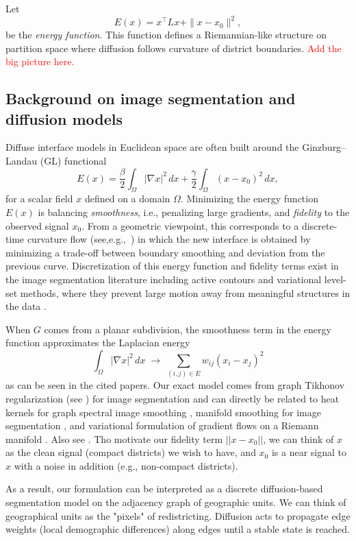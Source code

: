 \documentclass[11pt]{article}
\begin{document}
Let 
\[
E(x) = x^\top L x + \|x - x_0\|^2,
\]
be the \textit{energy function}. This function defines a Riemannian-like structure on partition space where diffusion follows curvature of district boundaries. \textcolor{red}{Add the big picture here.}


\subsection{Background on image segmentation and diffusion models}\label{sec:image}
Diffuse interface models in Euclidean space are often built around the Ginzburg–Landau (GL) functional
\[
E(x)
=
\frac{\beta}{2} \int_\Omega |\nabla x|^2 \, dx
+
\frac{\gamma}{2} \int_\Omega (x - x_0)^2 \, dx,
\]
for a scalar field $x$ defined on a domain $\Omega$. Minimizing the energy function $E(x)$ is  balancing \emph{smoothness}, i.e., penalizing large gradients, and \emph{fidelity} to the observed signal $x_0$. From a geometric viewpoint, this corresponds to a discrete-time curvature flow (see,e.g.,~\cite{esedog2015threshold}) in which the new interface is obtained by minimizing a trade-off between boundary smoothing and deviation from the previous curve. Discretization of this energy function and fidelity terms exist in the image segmentation literature including active contours and variational level-set methods, where they prevent large motion away from meaningful structures in the data \cite{chan2001active, bertozzi2012diffuse}.

When $G$ comes from a planar subdivision, the smoothness term in the energy function approximates the Laplacian energy
\[
\int_\Omega |\nabla x|^2 \, dx \;\longrightarrow\; \sum_{(i,j)\in E} w_{ij}(x_i-x_j)^2
\]
as can be seen in the cited papers. Our exact model comes from graph Tikhonov regularization (see \cite{pilavci2021graph, shuman2013emerging, lafon2006diffusion}) for image segmentation and can directly be related to heat kernels for graph spectral image smoothing \cite{zhang2008graph}, manifold smoothing for image segmentation \cite{elmoataz2008nonlocal}, and variational formulation of gradient flows on a Riemann manifold \cite{ambrosio2008gradient}. Also see \cite{taubin2012introduction}. Tho motivate our fidelity term $||x-x_0||$, we can think of $x$ as the clean signal (compact districts) we wish to have, and $x_0$ is a near signal to $x$ with a noise in addition (e.g., non-compact districts).  

As a result, our formulation can be interpreted as a discrete diffusion-based segmentation model on the adjacency graph of geographic units. We can think of geographical units as the "pixels" of redistricting. Diffusion acts to propagate edge weights (local demographic differences) along edges until a stable state is reached. 
\end{document}
